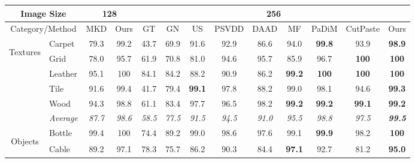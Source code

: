\documentclass[10pt,twocolumn,letterpaper]{article}
\begin{document}
\begin{table*}[!ht]
\footnotesize
\centering
\begin{tabular}{clccccccccccc}
\hline
\multicolumn{2}{c|}{Image Size} & \multicolumn{2}{c|}{128} & \multicolumn{9}{c}{256} \\ \hline
\multicolumn{2}{c|}{Category/Method} & \scriptsize {MKD\cite{mkd}} & \multicolumn{1}{c|}{Ours} & \scriptsize {GT\cite{gt}} & \scriptsize {GN\cite{gn}} & \scriptsize {US\cite{us}} & \scriptsize {PSVDD\cite{psvdd}} & \scriptsize {DAAD\cite{daad}} & \scriptsize {MF\cite{mf}} & \scriptsize {PaDiM\cite{padim}} & \scriptsize {CutPaste\cite{cutpaste}} & Ours \\ \hline
\multicolumn{1}{c|}{\multirow{6}{*}{\begin{turn}{90}Textures\end{turn}}} & \multicolumn{1}{l|}{Carpet} & 79.3 & \multicolumn{1}{c|}{99.2} & 43.7 & 69.9 & 91.6 & 92.9 & 86.6 & 94.0 & \textbf{99.8} & 93.9 & \textbf{98.9} \\ 
\multicolumn{1}{c|}{} & \multicolumn{1}{l|}{Grid} & 78.0 & \multicolumn{1}{c|}{95.7} & 61.9 & 70.8 & 81.0 & 94.6 & 95.7 & 85.9 & 96.7 & \textbf{100} & \textbf{100} \\ 
\multicolumn{1}{c|}{} & \multicolumn{1}{l|}{Leather} & 95.1 & \multicolumn{1}{c|}{100} & 84.1 & 84.2 & 88.2 & 90.9 & 86.2 & \textbf{99.2} & \textbf{100} & \textbf{100} & \textbf{100} \\ 
\multicolumn{1}{c|}{} & \multicolumn{1}{l|}{Tile} & 91.6 & \multicolumn{1}{c|}{99.4} & 41.7 & 79.4 & \textbf{99.1} & 97.8 & 88.2 & 99.0 & 98.1 & 94.6 & \textbf{99.3} \\ 
\multicolumn{1}{c|}{} & \multicolumn{1}{l|}{Wood} & 94.3 & \multicolumn{1}{c|}{98.8} & 61.1 & 83.4 & 97.7 & 96.5 & 98.2 & \textbf{99.2} & \textbf{99.2} & \textbf{99.1} & \textbf{99.2} \\ \cline{2-13} 
\multicolumn{1}{c|}{} & \multicolumn{1}{l|}{\textit{Average}} & \textit{87.7} & \multicolumn{1}{c|}{\textit{98.6}} & \textit{58.5} & \textit{77.5} & \textit{91.5} & \textit{94.5} & \textit{91.0} & \textit{95.5} & \textit{98.8} & \textit{97.5} & \textit{\textbf{99.5}} \\ \hline
\multicolumn{1}{c|}{\multirow{11}{*}{\begin{turn}{90}Objects\end{turn}}} & \multicolumn{1}{l|}{Bottle} & 99.4 & \multicolumn{1}{c|}{100} & 74.4 & 89.2 & 99.0 & 98.6 & 97.6 & 99.1 & \textbf{99.9} & 98.2 & \textbf{100} \\ 
\multicolumn{1}{c|}{} & \multicolumn{1}{l|}{Cable} & 89.2 & \multicolumn{1}{c|}{97.1} & 78.3 & 75.7 & 86.2 & 90.3 & 84.4 & \textbf{97.1} & 92.7 & 81.2 & \textbf{95.0} \\ 

\end{tabular}
\end{table*}
\end{document}

